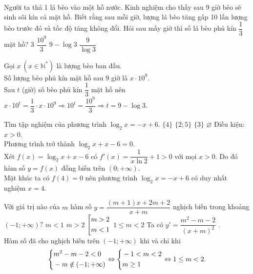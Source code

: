 \begin{ex}%
Người ta thả 1 lá bèo vào một hồ nước. Kinh nghiệm cho thấy sau 9 giờ bèo sẽ sinh sôi kín cả mặt hồ. Biết rằng sau mỗi giờ, lượng lá bèo tăng gấp 10 lần lượng bèo trước đó và tốc độ tăng không đổi. Hỏi sau mấy giờ thì số lá bèo phủ kín $ \dfrac{1}{3} $ mặt hồ?
\choice
{$3$}
{$ \dfrac{10^9}{3} $ }
{\True $9 - \log 3$}
{$ \dfrac{9}{\log 3} $}

	\loigiai
	{
Gọi $ x \ ( x \in \mathbb{N}^*)$ là lượng bèo ban đầu.\\
Số lượng bèo phủ kín mặt hồ sau 9 giờ là $ x \cdot 10^9 $.\\
Sau $ t $ (giờ) số bèo phủ kín $ \dfrac{1}{3} $ mặt hồ nên $ x \cdot 10^t = \dfrac{1}{3} \cdot x \cdot 10^9 \Rightarrow 10^t = \dfrac{10^9}{3} \Rightarrow t = 9 - 
\log 3.$
	}
\end{ex}
\begin{ex}%
Tìm tập nghiệm của phương trình $ \log_2 x = -x + 6 $.
\choice
{\True  $\{4\}$}
{$\{2;5\}$}
{$\{3\}$}
{$\varnothing$}
	\loigiai
	{Điều kiện: $ x > 0 $.\\
		Phương trình trở thành $ \log_2 x + x - 6 = 0 $.\\
		Xét $ f(x) =\log_2 x + x - 6  $ có $ f'(x) = \dfrac{1}{x \ln 2} + 1 > 0 $ với mọi $ x > 0 $. Do đó hàm số $ y = f(x) $ đồng biến trên $ (0;+\infty) $.\\
		Mặt khác ta có $ f(4) = 0 $ nên phương trình $ \log_2 x = -x + 6 $ có duy nhất nghiệm $ x = 4. $
	}
\end{ex}
\begin{ex}%
Với giá trị nào của $ m $ hàm số $ y = \dfrac{(m+1)x + 2m + 2}{x + m} $ nghịch biến trong khoảng $ (-1;+\infty) $?
\choice
{$ m < 1 $}
{$ m>2 $}
{$ \left[\begin{aligned}&m>2 \\ &m<1\end{aligned}\right. $}
{\True $ 1 \le m < 2 $}
	\loigiai
	{
	Ta có $ y' = \dfrac{m^2 - m - 2}{(x+m)^2} $	.\\
	Hàm số đã cho nghịch biến trên $ (-1;+\infty) $ khi và chỉ khi 
\begin{eqnarray*}
\left\{\begin{aligned}&m^2 - m -2 < 0 \\&-m \notin (-1;+\infty)\end{aligned}\right. \Leftrightarrow \left\{\begin{aligned}&-1 < m < 2 \\& m \ge 1\end{aligned}\right. \Leftrightarrow 1 \le m < 2.	
\end{eqnarray*}
	}
\end{ex}

